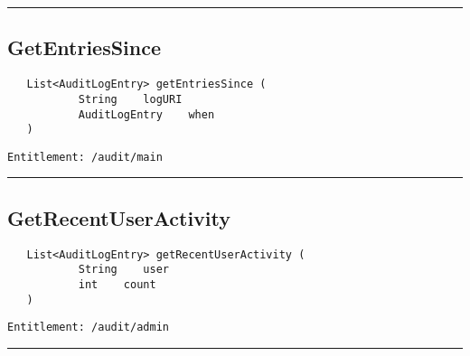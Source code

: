 \rule{12cm}{2pt}
\subsection{GetEntriesSince}
\label{Api:GetEntriesSince}
\begin{verbatim}
   List<AuditLogEntry> getEntriesSince (
           String    logURI
           AuditLogEntry    when
   )
\end{verbatim}
\begin{Verbatim}[fontsize=\small, formatcom=\color{Maroon}]
  Entitlement: /audit/main
\end{Verbatim}



\rule{12cm}{2pt}
\subsection{GetRecentUserActivity}
\label{Api:GetRecentUserActivity}
\begin{verbatim}
   List<AuditLogEntry> getRecentUserActivity (
           String    user
           int    count
   )
\end{verbatim}
\begin{Verbatim}[fontsize=\small, formatcom=\color{Maroon}]
  Entitlement: /audit/admin
\end{Verbatim}



\rule{12cm}{2pt}
